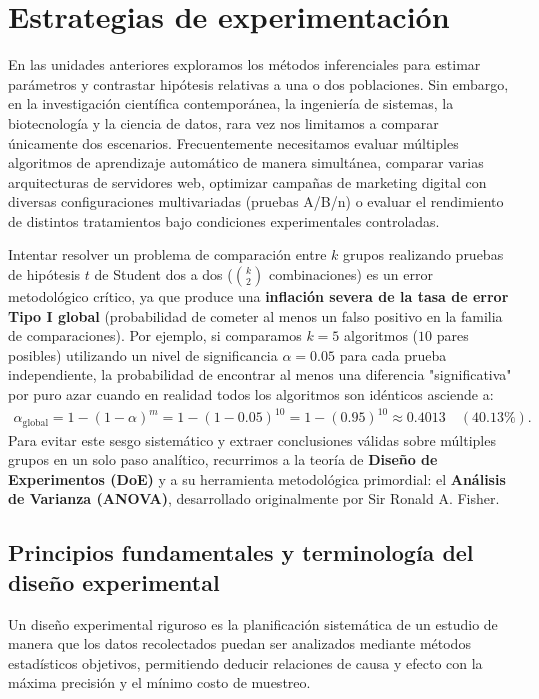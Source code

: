 \section{Estrategias de experimentación}

En las unidades anteriores exploramos los métodos inferenciales para estimar parámetros y contrastar hipótesis relativas a una o dos poblaciones. Sin embargo, en la investigación científica contemporánea, la ingeniería de sistemas, la biotecnología y la ciencia de datos, rara vez nos limitamos a comparar únicamente dos escenarios. Frecuentemente necesitamos evaluar múltiples algoritmos de aprendizaje automático de manera simultánea, comparar varias arquitecturas de servidores web, optimizar campañas de marketing digital con diversas configuraciones multivariadas (pruebas A/B/n) o evaluar el rendimiento de distintos tratamientos bajo condiciones experimentales controladas.

Intentar resolver un problema de comparación entre $k$ grupos realizando pruebas de hipótesis $t$ de Student dos a dos ($\binom{k}{2}$ combinaciones) es un error metodológico crítico, ya que produce una \textbf{inflación severa de la tasa de error Tipo I global} (probabilidad de cometer al menos un falso positivo en la familia de comparaciones). Por ejemplo, si comparamos $k = 5$ algoritmos ($10$ pares posibles) utilizando un nivel de significancia $\alpha = 0.05$ para cada prueba independiente, la probabilidad de encontrar al menos una diferencia "significativa" por puro azar cuando en realidad todos los algoritmos son idénticos asciende a:
\begin{align}
	\alpha_{\text{global}} = 1 - (1 - \alpha)^m = 1 - (1 - 0.05)^{10} = 1 - (0.95)^{10} \approx 0.4013 \quad (40.13\%).
\end{align}
Para evitar este sesgo sistemático y extraer conclusiones válidas sobre múltiples grupos en un solo paso analítico, recurrimos a la teoría de \textbf{Diseño de Experimentos (DoE)} y a su herramienta metodológica primordial: el \textbf{Análisis de Varianza (ANOVA)}, desarrollado originalmente por Sir Ronald A. Fisher.

\subsection{Principios fundamentales y terminología del diseño experimental}

Un diseño experimental riguroso es la planificación sistemática de un estudio de manera que los datos recolectados puedan ser analizados mediante métodos estadísticos objetivos, permitiendo deducir relaciones de causa y efecto con la máxima precisión y el mínimo costo de muestreo.

